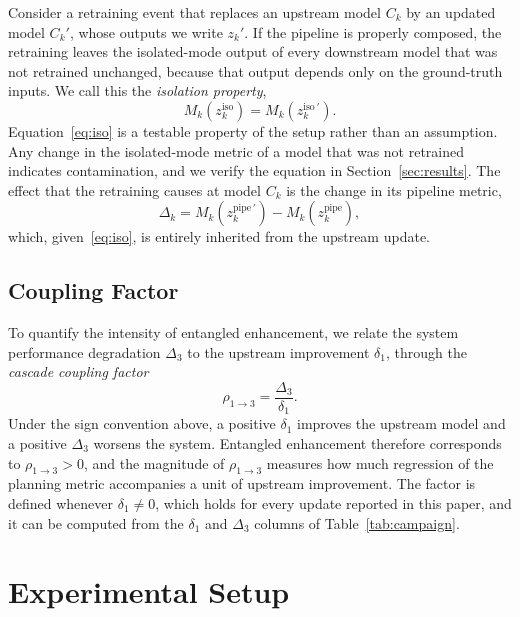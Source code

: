 \documentclass[conference]{IEEEtran}
\begin{document}
Consider a retraining event that replaces an upstream model $C_k$ by an updated
model $C_k'$, whose outputs we write $z_k'$. If the pipeline is properly composed,
the retraining leaves the isolated-mode output of every downstream model that was
not retrained unchanged, because that output depends only on the ground-truth
inputs. We call
this the \emph{isolation property},
\begin{equation}
M_k(z_k^{\text{iso}}) = M_k(z_k^{\text{iso}\,\prime}).
\label{eq:iso}
\end{equation}
Equation~\eqref{eq:iso} is a testable property of the setup rather than an
assumption. Any change in the isolated-mode metric of a model that was not retrained indicates
contamination, and we verify the equation in Section~\ref{sec:results}. The effect
that the retraining causes at model $C_k$ is the change in its pipeline
metric,
\begin{equation}
\Delta_k = M_k(z_k^{\text{pipe}\,\prime}) - M_k(z_k^{\text{pipe}}),
\label{eq:inj}
\end{equation}
which, given~\eqref{eq:iso}, is entirely inherited from the upstream update.

\subsection{Coupling Factor}
\label{sec:diag}
To quantify the intensity of entangled enhancement, we relate the system performance degradation $\Delta_3$ to the upstream
improvement $\delta_1$, through the \emph{cascade coupling
factor}
\begin{equation}
\rho_{1\to 3} = \frac{\Delta_3}{\delta_1}.
\label{eq:rho-def}
\end{equation}
Under the sign convention above, a positive $\delta_1$ improves the upstream model
and a positive $\Delta_3$ worsens the system. Entangled enhancement therefore
corresponds to $\rho_{1\to 3} > 0$, and the magnitude of $\rho_{1\to 3}$ measures
how much regression of the planning metric accompanies a unit of upstream
improvement. The factor is defined whenever $\delta_1 \neq 0$, which holds for
every update reported in this paper, and it can be computed from the $\delta_1$
and $\Delta_3$ columns of Table~\ref{tab:campaign}.
\section{Experimental Setup}
\label{sec:setup}
\end{document}
